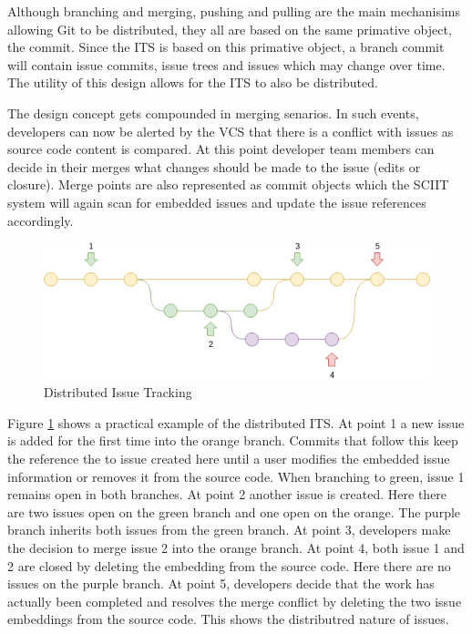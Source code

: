 \documentclass{mproj}
\begin{document}
Although branching and merging, pushing and pulling are the main mechanisims allowing Git to be distributed, they all are based on the same primative object, the commit. Since the ITS is based on this primative object, a branch commit will contain issue commits, issue trees and issues which may change over time. The utility of this design allows for the ITS to also be distributed.

The design concept gets compounded in merging senarios. In such events, developers can now be alerted by the VCS that there is a conflict with issues as source code content is compared. At this point developer team members can decide in their merges what changes should be made to the issue (edits or closure). Merge points are also represented as commit objects which the SCIIT system will again scan for embedded issues and update the issue references accordingly.

\begin{figure}[t]
\caption{Distributed Issue Tracking}
\label{fig:distributed-issue-tracking}
\centering
\includegraphics[width=15cm]{distributed-issue-tracking}
\end{figure}

Figure \ref{fig:distributed-issue-tracking} shows a practical example of the distributed ITS. At point 1 a new issue is added for the first time into the orange branch. Commits that follow this keep the reference the to issue created here until a user modifies the embedded issue information or removes it from the source code. When branching to green, issue 1 remains open in both branches. At point 2 another issue is created. Here there are two issues open on the green branch and one open on the orange. The purple branch inherits both issues from the green branch. At point 3, developers make the decision to merge issue 2 into the orange branch. At point 4, both issue 1 and 2 are closed by deleting the embedding from the source code. Here there are no issues on the purple branch. At point 5, developers decide that the work has actually been completed and resolves the merge conflict by deleting the two issue embeddings from the source code. This shows the distributred nature of issues.
\end{document}
